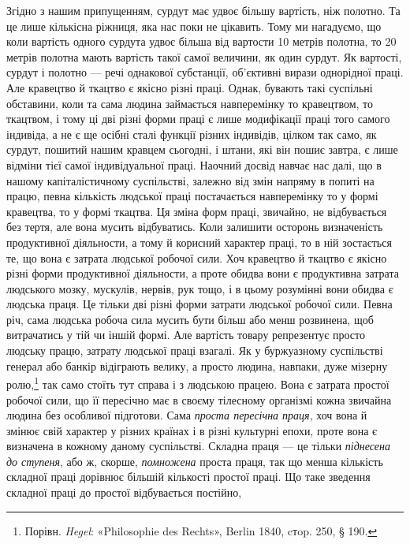 Згідно з нашим припущенням, сурдут має удвоє більшу вартість,
ніж полотно. Та це лише кількісна ріжниця, яка нас поки
не цікавить. Тому ми нагадуємо, що коли вартість одного
сурдута удвоє більша від вартости 10 метрів полотна, то 20 метрів
полотна мають вартість такої самої величини, як один сурдут. Як
вартості, сурдут і полотно — речі однакової субстанції, об’єктивні
вирази однорідної праці. Але кравецтво й ткацтво є якісно
різні праці. Однак, бувають такі суспільні обставини, коли та
сама людина займається навперемінку то кравецтвом, то ткацтвом,
і тому ці дві різні форми праці є лише модифікації праці
того самого індивіда, а не є ще осібні сталі функції різних індивідів,
цілком так само, як сурдут, пошитий нашим кравцем сьогодні,
і штани, які він пошиє завтра, є лише відміни тієї самої
індивідуальної праці. Наочний досвід навчає нас далі, що в нашому
капіталістичному суспільстві, залежно від змін напряму
в попиті на працю, певна кількість людської праці постачається
навперемінку то у формі кравецтва, то у формі ткацтва. Ця зміна
форм праці, звичайно, не відбувається без тертя, але вона мусить
відбуватись. Коли залишити осторонь визначеність продуктивної
діяльности, а тому й корисний характер праці, то в ній зостається
те, що вона є затрата людської робочої сили. Хоч кравецтво й
ткацтво є якісно різні форми продуктивної діяльности, а проте
обидва вони є продуктивна затрата людського мозку, мускулів,
нервів, рук тощо, і в цьому розумінні вони обидва є людська праця.
Це тільки дві різні форми затрати людської робочої сили. Певна
річ, сама людська робоча сила мусить бути більш або менш розвинена,
щоб витрачатись у тій чи іншій формі. Але вартість товару
репрезентує просто людську працю, затрату людської праці
взагалі. Як у буржуазному суспільстві генерал або банкір відіграють
велику, а просто людина, навпаки, дуже мізерну ролю,\footnote{
Порівн. \emph{Hegel}: «Philosophie des Rechts», Berlin 1840, cтop. 250,
§ 190.
}
так само стоїть тут справа і з людською працею. Вона є затрата
простої робочої сили, що її пересічно має в своєму тілесному
організмі кожна звичайна людина без особливої підготови. Сама
\emph{проста пересічна праця}, хоч вона й змінює свій характер у різних
країнах і в різні культурні епохи, проте вона є визначена в кожному
даному суспільстві. Складна праця — це тільки \emph{піднесена
до ступеня}, або ж, скорше, \emph{помножена} проста праця, так що менша
кількість складної праці дорівнює більшій кількості простої праці.
Що таке зведення складної праці до простої відбувається постійно,

